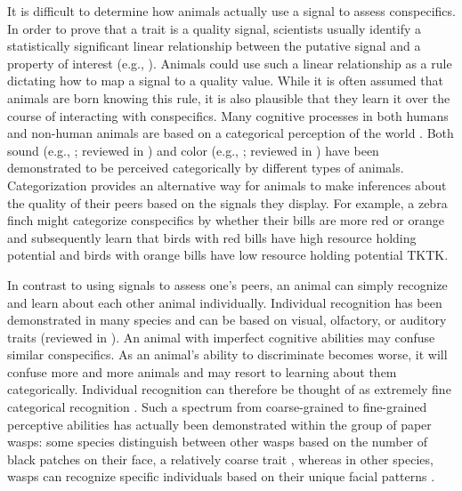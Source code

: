 It is difficult to determine how animals actually use a signal to assess conspecifics. In order to prove that a trait is a quality signal, scientists usually identify a statistically significant linear relationship between the putative signal and a property of interest (e.g., \citep{Rohwer:1981vn,Rohwer:1982fk,Ripoll:2004vn,Tibbetts:2004kx}). Animals could use such a linear relationship as a rule dictating how to map a signal to a quality value. While it is often assumed that animals are born knowing this rule, it is also plausible that they learn it over the course of interacting with conspecifics. Many cognitive processes in both humans and non-human animals are based on a categorical perception of the world \citep{Harnad:1990ux}. Both sound (e.g., \citep{Wyttenbach:1996wj,Nelson:1989rt}; reviewed in \citep{Bornstein:1987ec,Ehret:1987jh}) and color (e.g., \citep{Lim:2016ye}; reviewed in \citep{Bornstein:1987ec}) have been demonstrated to be perceived categorically by different types of animals. Categorization provides an alternative way for animals to make inferences about the quality of their peers based on the signals they display. For example, a zebra finch might categorize conspecifics by whether their bills are more red or orange and subsequently learn that birds with red bills have high resource holding potential and birds with orange bills have low resource holding potential TKTK.   
 
In contrast to using signals to assess one's peers, an animal can simply recognize and learn about each other animal individually. Individual recognition has been demonstrated in many species and can be based on visual, olfactory, or auditory traits (reviewed in \citep{Tibbetts2007IndividualDifferent}). An animal with imperfect cognitive abilities may confuse similar conspecifics. As an animal's ability to discriminate becomes worse, it will confuse more and more animals and may resort to learning about them categorically. Individual recognition can therefore be thought of as extremely fine categorical recognition \citep{Barnard:1979fk}. Such a spectrum from coarse-grained to fine-grained perceptive abilities has actually been demonstrated within the group of paper wasps: some species distinguish between other wasps based on the number of black patches on their face, a relatively coarse trait \citep{Tibbetts:2004kx}, whereas in other species, wasps can recognize specific individuals based on their unique facial patterns \citep{Tibbetts:2002ys}. 

